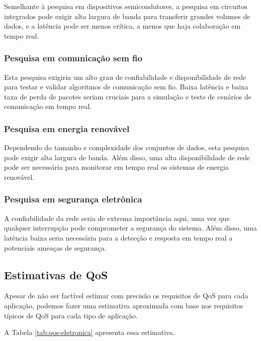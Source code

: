 Semelhante à pesquisa em dispositivos semicondutores, a pesquisa em circuitos integrados pode exigir alta largura de banda para transferir grandes volumes de dados, e a latência pode ser menos crítica, a menos que haja colaboração em tempo real.

\subsubsection{Pesquisa em comunicação sem fio}

Esta pesquisa exigiria um alto grau de confiabilidade e disponibilidade de rede para testar e validar algoritmos de comunicação sem fio. Baixa latência e baixa taxa de perda de pacotes seriam cruciais para a simulação e teste de cenários de comunicação em tempo real.

\subsubsection{Pesquisa em energia renovável}

Dependendo do tamanho e complexidade dos conjuntos de dados, esta pesquisa pode exigir alta largura de banda. Além disso, uma alta disponibilidade de rede pode ser necessária para monitorar em tempo real os sistemas de energia renovável.

\subsubsection{Pesquisa em segurança eletrônica}

A confiabilidade da rede seria de extrema importância aqui, uma vez que qualquer interrupção pode comprometer a segurança do sistema. Além disso, uma latência baixa seria necessária para a detecção e resposta em tempo real a potenciais ameaças de segurança.
    
\subsection{Estimativas de QoS}

Apesar de não ser factível estimar com precisão os requisitos de QoS para cada aplicação, podemos
fazer uma estimativa aproximada com base nos requisitos típicos de QoS para cada tipo de aplicação.

A Tabela \ref{tab:qos-eletronica} apresenta essa estimativa.

